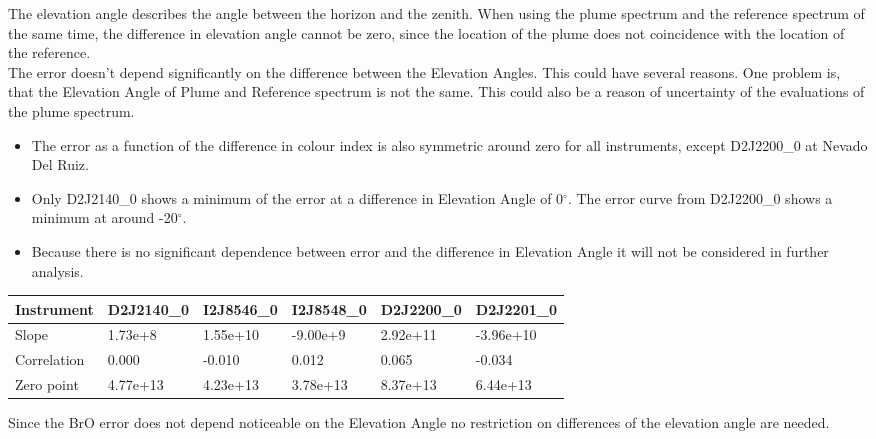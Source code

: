 \documentclass  [
  paper    = a4,
  BCOR     = 10mm,
  twoside,
  fontsize = 12pt,
  fleqn,
  toc      = bibnumbered,
  toc      = listofnumbered,
  numbers  = noendperiod,
  headings = normal,
  listof   = leveldown,
  version  = 3.03
]                                       {scrreprt}
\begin{document}
	The elevation angle describes the angle between the horizon and the zenith. When using the plume spectrum and the reference spectrum of the same time, the difference in elevation angle cannot be zero, since the location of the plume does not coincidence with the location of the reference.\\
	The  error doesn't depend significantly on the difference between the Elevation Angles. This could have several reasons. One problem is, that the Elevation Angle of Plume and Reference spectrum is not the same. This could also be a reason of uncertainty of the evaluations of the plume spectrum.

	\begin{itemize}
		\item The   error as a function of the difference in colour index is also symmetric around zero for all instruments, except  D2J2200\_0 at Nevado Del Ruiz. 
		\item Only D2J2140\_0 shows a minimum of the   error at a difference in Elevation Angle of 0$^{\circ}$. The   error curve from D2J2200\_0 shows a minimum at around -20$^{\circ}$.
		\item Because there is no significant dependence between   error and the difference in Elevation Angle it will not be considered in further analysis.
	\end{itemize}
	\begin{table}[h]
		\begin{tabular}{|p{2cm}|p{2cm}|p{2cm}|p{2cm}|p{2cm}|p{2cm}|}
			Instrument	&D2J2140\_0&I2J8546\_0& I2J8548\_0&D2J2200\_0&D2J2201\_0\\
			\toprule
			Slope& 1.73e+8& 1.55e+10  &-9.00e+9 &2.92e+11&-3.96e+10\\
			\midrule
			Correlation&
			0.000&
			-0.010&
			0.012&
			0.065&
			-0.034\\
			\midrule
			Zero point&4.77e+13&4.23e+13&3.78e+13&8.37e+13 &6.44e+13 \\
			\bottomrule
		\end{tabular}
	\end{table}
	Since the BrO error does not depend noticeable on the Elevation Angle no restriction on differences of the elevation angle are needed.
\end{document}
